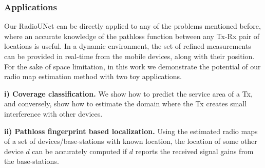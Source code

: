 \documentclass[10pt,a4paper]{article}
\begin{document}


\subsubsection{Applications}

Our RadioUNet can be directly applied to any of the problems mentioned before, 
where an accurate knowledge of the pathloss function between any Tx-Rx pair of locations is useful. In a dynamic environment, the set of refined measurements can be provided in real-time from the mobile devices, along with their position. For the sake of space limitation, in this work we demonstrate the potential of our radio map estimation method with two \textcolor{black}{toy} applications.

\par{\noindent\textbf{i) Coverage classification.}}
We show how to predict the service area of a Tx, and conversely, show how to estimate the domain where the Tx creates  
small interference with other devices.

\par{\noindent\textbf{ii) Pathloss fingerprint based localization.}}
Using the estimated radio maps of a set of devices/base-stations with known location, the location of some other device $d$ can be accurately computed if $d$ reports the received signal gains from the base-stations. %
    
\end{document}
